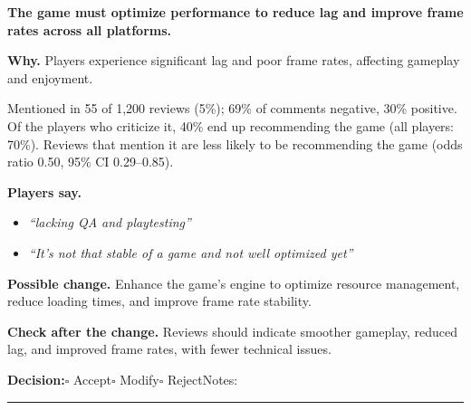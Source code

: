 \documentclass[10pt]{article}
\begin{document}
\begin{tcolorbox}[colback=white,colframe=gR,colbacktitle=lR,coltitle=black,title={\textbf{R4}\quad Performance and Technical Implementation\hfill\textcolor{gR}{\textbf{Repair first}}},boxrule=0.8pt,arc=2pt,left=6pt,right=6pt,top=4pt,bottom=4pt,before skip=8pt,after skip=8pt]
{\large\textbf{The game must optimize performance to reduce lag and improve frame rates across all platforms.}}

\smallskip
\textbf{Why.} Players experience significant lag and poor frame rates, affecting gameplay and enjoyment.

\smallskip
{\small Mentioned in 55 of 1,200 reviews (5\%); 69\% of comments negative, 30\% positive. Of the players who criticize it, 40\% end up recommending the game (all players: 70\%). Reviews that mention it are less likely to be recommending the game {\color{ink2}\footnotesize(odds ratio 0.50, 95\% CI 0.29--0.85)}.}

\smallskip
\textbf{Players say.}
\begin{itemize}[leftmargin=12pt,itemsep=1pt,topsep=2pt]
    \item \textit{``lacking QA and playtesting''}
    \item \textit{``It's not that stable of a game and not well optimized yet''}
\end{itemize}
\textbf{Possible change.} Enhance the game's engine to optimize resource management, reduce loading times, and improve frame rate stability.

\smallskip
\textbf{Check after the change.} Reviews should indicate smoother gameplay, reduced lag, and improved frame rates, with fewer technical issues.

\medskip
{\small\textbf{Decision:}\quad $\square$ Accept\quad $\square$ Modify\quad $\square$ Reject\qquad Notes: \rule{0.38\linewidth}{0.4pt}}
\end{tcolorbox}
\end{document}
